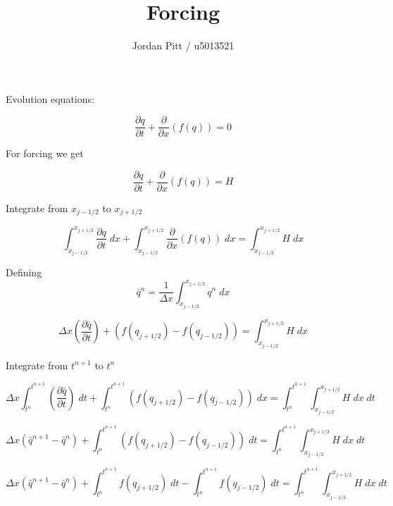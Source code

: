 \documentclass[12pt]{article}
\begin{document}
\title{Forcing}
\author{Jordan Pitt / u5013521}

Evolution equations:

\begin{equation}
\frac{\partial q}{\partial t} + \frac{\partial}{\partial x}\left(f(q)\right) = 0
\end{equation}

For forcing we get

\begin{equation}
\frac{\partial q}{\partial t} + \frac{\partial}{\partial x}\left(f(q)\right) = H
\end{equation}

Integrate from $x_{j-1/2}$ to $x_{j+1/2}$

\begin{equation}
\int_{x_{j-1/2}}^{x_{j+1/2}}\frac{\partial q}{\partial t} \; dx +  \int_{x_{j-1/2}}^{x_{j+1/2}} \frac{\partial}{\partial x}\left(f(q)\right) \; dx  =  \int_{x_{j-1/2}}^{x_{j+1/2}} H \; dx
\end{equation}

Defining $$\bar{q}^n= \frac{1}{\Delta x} \int_{x_{j-1/2}}^{x_{j+1/2}} q^n\; dx$$

\begin{equation}
\Delta x\left(\frac{\partial \bar{q}}{\partial t}  \right)+  \left(f(q_{j+1/2}) -f(q_{j-1/2}) \right)  =  \int_{x_{j-1/2}}^{x_{j+1/2}} H \; dx
\end{equation}

Integrate from $t^{n+1}$ to $t^n$

\begin{equation}
\Delta x \int_{t^n}^{t^{n+1}}\left(\frac{\partial \bar{q}}{\partial t}  \right) \; dt+  \int_{t^n}^{t^{n+1}} \left(f(q_{j+1/2}) -f(q_{j-1/2}) \right) \; dx  =   \int_{t^n}^{t^{n+1}} \int_{x_{j-1/2}}^{x_{j+1/2}} H \; dx \; dt
\end{equation}

\begin{equation}
\Delta x \left(\bar{q}^{n+1} - \bar{q}^n  \right) +  \int_{t^n}^{t^{n+1}} \left(f(q_{j+1/2}) -f(q_{j-1/2}) \right) \; dt  =   \int_{t^n}^{t^{n+1}} \int_{x_{j-1/2}}^{x_{j+1/2}} H \; dx \; dt
\end{equation}

\begin{equation}
\Delta x \left(\bar{q}^{n+1} - \bar{q}^n  \right) +  \int_{t^n}^{t^{n+1}}f(q_{j+1/2}) \; dt - \int_{t^n}^{t^{n+1}}f(q_{j-1/2}) \; dt  =   \int_{t^n}^{t^{n+1}} \int_{x_{j-1/2}}^{x_{j+1/2}} H \; dx \; dt
\end{equation}
\end{document}
